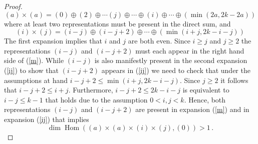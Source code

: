 \documentclass[10pt,a4paper]{amsart}
\def\be{\begin{equation}}
\def\ee{\end{equation}}
\begin{document}
\begin{proof}
\begin{equation}\label{m}
        (a)\times(a)=(0)\oplus (2)\oplus\cdots(j)\oplus\cdots\oplus (i)\oplus\cdots \oplus \left(\operatorname{min}(2a,2k-2a)\right)
    \end{equation}
    where at least two representations must be present in the direct sum, 
    and
    \begin{equation}\label{ij}
        (i)\times(j)= (i-j)\oplus (i-j+2)\oplus\cdots \oplus \left(\operatorname{min}(i+j,2k-i-j)\right)
    \end{equation}
    The first expansion implies that  $i$ and $j$ are both even. Since $i\ge j$ and $j\ge 2$ the representations $(i-j)$ and $(i-j+2)$ must each appear in the right hand side of (\ref{m}). 
    While $(i-j)$ is also manifestly  present in the second expansion (\ref{ij}) to show that $(i-j+2)$ appears in (\ref{ij}) we need to check that under the assumptions at hand $i-j+2 \le \operatorname{min}(i+j,2k-i-j)$. Since $j\ge 2$ it follows that $i-j+2 \le i + j$. Furthermore, $i-j+2 \le 2k-i-j$ is equivalent to $i-j\le k-1$ that holds 
    due to the assumption $0<i,j<k$.   Hence, both representations $(i-j)$ and $(i-j+2)$ are present in expansion (\ref{m}) and in expansion (\ref{ij}) that implies 
    \be
     \operatorname{dim}\operatorname{Hom}\left((a)\times(a)\times(i)\times(j),(0)\right) >1 \, .
    \ee
   
    


\end{proof}
\end{document}
